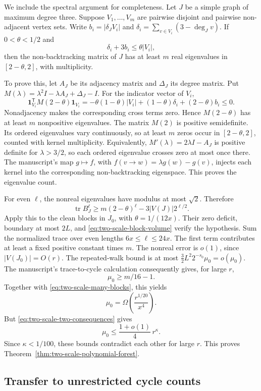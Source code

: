 We include the spectral argument for completeness.
Let $J$ be a simple graph of maximum degree three.
Suppose $V_1,\ldots,V_m$ are pairwise disjoint and pairwise non-adjacent vertex sets.
Write $b_i=|\delta_J V_i|$ and
$\delta_i=\sum_{v\in V_i}(3-\deg_J v)$.
If $0<\theta<1/2$ and
\[
 \delta_i+3b_i\le\theta|V_i|,
\]
then the non-backtracking matrix of $J$ has at least $m$ real eigenvalues in $[2-\theta,2]$, with multiplicity.

To prove this, let $A_J$ be its adjacency matrix and $\Delta_J$ its degree matrix.
Put $M(\lambda)=\lambda^2I-\lambda A_J+\Delta_J-I$.
For the indicator vector of $V_i$,
\[
 \mathbf1_{V_i}^{\mathsf T}M(2-\theta)\mathbf1_{V_i}
 =-\theta(1-\theta)|V_i|
 +(1-\theta)\delta_i+(2-\theta)b_i\le0.
\]
Nonadjacency makes the corresponding cross terms zero.
Hence $M(2-\theta)$ has at least $m$ nonpositive eigenvalues.
The matrix $M(2)$ is positive semidefinite.
Its ordered eigenvalues vary continuously, so at least $m$ zeros occur in $[2-\theta,2]$, counted with kernel multiplicity.
Equivalently, $M'(\lambda)=2\lambda I-A_J$ is positive definite for $\lambda>3/2$, so each ordered eigenvalue crosses zero at most once there.
The manuscript's map
$g\mapsto f$, with $f(v\to w)=\lambda g(w)-g(v)$,
injects each kernel into the corresponding non-backtracking eigenspace.
This proves the eigenvalue count.

For even $\ell$, the nonreal eigenvalues have modulus at most $\sqrt2$.
Therefore
\[
 \operatorname{tr}B_J^\ell
 \ge m(2-\theta)^\ell-3|V(J)|2^{\ell/2}.
\]
Apply this to the clean blocks in $J_0$, with $\theta=1/(12x)$.
Their zero deficit, boundary at most $2L$, and \eqref{eq:two-scale-block-volume} verify the hypothesis.
Sum the normalized trace over even lengths $6x\le\ell\le24x$.
The first term contributes at least a fixed positive constant times $m$.
The nonreal error is $o(1)$, since $|V(J_0)|=O(r)$.
The repeated-walk bound is at most
$\tfrac32L^2 2^{-s_0}\mu_0=o(\mu_0)$.
The manuscript's trace-to-cycle calculation consequently gives, for large $r$,
\[
 \mu_0\ge m/16-1.
\]
Together with \eqref{eq:two-scale-many-blocks}, this yields
\[
 \mu_0=\Omega\!\left(\frac{r^{1/20}}{x^4}\right).
\]
But \eqref{eq:two-scale-two-consequences} gives
\[
 \mu_0\le\frac{1+o(1)}4\,r^\kappa.
\]
Since $\kappa<1/100$, these bounds contradict each other for large $r$.
This proves Theorem~\ref{thm:two-scale-polynomial-forest}.

\subsection{Transfer to unrestricted cycle counts}

